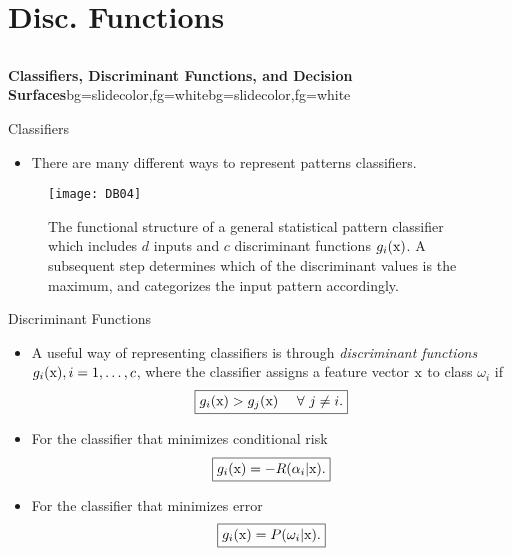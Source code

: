 \section{Disc. Functions}
\subsection{}
\begin{frame}{}
\begin{variableblock}{\centering \Large \textbf{\vspace{4pt}\newline Classifiers, Discriminant Functions, and Decision Surfaces\vspace{4pt}}}{bg=slidecolor,fg=white}{bg=slidecolor,fg=white}
\end{variableblock}
\end{frame}

\begin{frame}{Classifiers}
\begin{itemize}
\item There are many different ways to represent patterns classifiers.
\end{itemize}
\begin{figure}
\texttt{[image: DB04]}
\caption{The functional structure of a general statistical pattern classifier which includes $d$ inputs and $c$ discriminant functions $g_i({\rm x})$. A subsequent step determines which of the discriminant values is the maximum, and categorizes the input pattern accordingly.}
\end{figure}
\end{frame}

\begin{frame}{Discriminant Functions}
\begin{itemize}
\item A useful way of representing classifiers is through \textit{\color{mycolor2}discriminant functions} $g_i({\rm x}),i=1,\ldots,c$, where the classifier assigns a feature vector ${\rm x}$ to class $\omega_i$ if
\[\boxed{g_i({\rm x})>g_j({\rm x})~~~~\forall~j\neq i.}\]
\item For the classifier that minimizes conditional risk
\[\boxed{g_i({\rm x})=-R(\alpha_i|{\rm x}).}\]
\item For the classifier that minimizes error
\[\boxed{g_i({\rm x})=P(\omega_i|{\rm x}).}\]
\end{itemize}
\end{frame}

